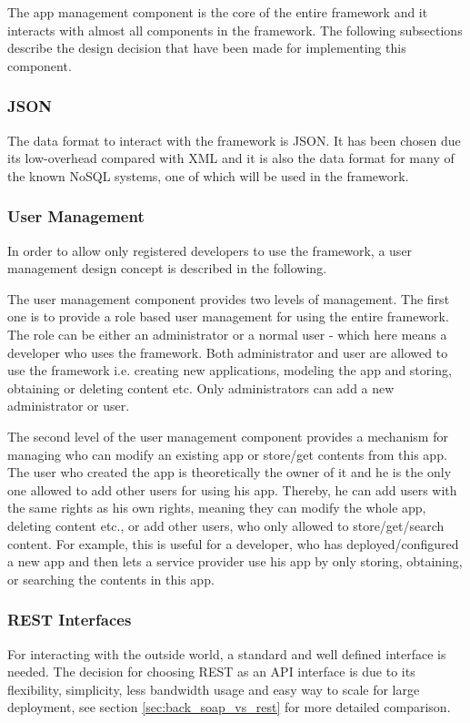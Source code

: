 The app management component is the core of the entire framework and it interacts with almost all components in the framework. The following subsections describe the design decision that have been made for implementing this component.

\subsubsection{JSON}
The data format to interact with the framework is \ac{JSON}. It has been chosen due its low-overhead compared with \ac{XML} and it is also the data format for many of the known \ac{NoSQL} systems, one of which will be used in the framework.
 
\subsubsection{User Management \label{sec:des_user_man}}
In order to allow only registered developers to use the framework, a user management design concept is described in the following.

The user management component provides two levels of management. The first one is to provide a role based user management for using the entire framework. The role can be either an administrator or a normal user - which here means a developer who uses the framework. Both administrator and user are allowed to use the framework i.e. creating new applications, modeling the app and storing, obtaining or deleting content etc. Only administrators can add a new administrator or user.

The second level of the user management component provides a mechanism for managing who can modify an existing app or store/get contents from this app. The user who created the app is theoretically the owner of it and he is the only one allowed to add other users for using his app. Thereby, he can add users with the same rights as his own rights, meaning they can modify the whole app, deleting content etc., or add other users, who only allowed to store/get/search content. For example, this is useful for a developer, who has deployed/configured a new app and then lets a service provider use his app by only storing, obtaining,  or searching the contents in this app. 

\subsubsection{REST Interfaces \label{sec:des_rest_api}} For interacting with the outside world, a standard and well defined interface is needed. The decision for choosing \ac{REST} as an \ac{API} interface is due to its flexibility, simplicity, less bandwidth usage and easy way to scale for large deployment, see section \ref{sec:back_soap_vs_rest} for more detailed comparison.

